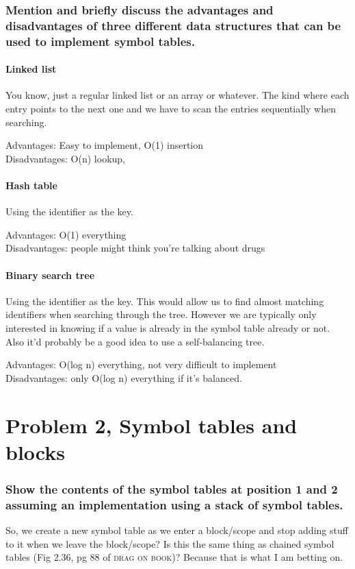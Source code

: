 \subsubsection{Mention and briefly discuss the advantages and disadvantages of three different data structures that can be used to implement symbol tables.}
\paragraph{Linked list}

You know, just a regular linked list or an array or whatever.
The kind where each entry points to the next one and we have to scan the entries sequentially when searching.

Advantages: Easy to implement, O(1) insertion\\
Disadvantages: O(n) lookup, 


\paragraph{Hash table}

Using the identifier as the key.

Advantages: O(1) everything\\
Disadvantages: people might think you're talking about drugs

\paragraph{Binary search tree}

Using the identifier as the key.
This would allow us to find almost matching identifiers when searching through the tree.
However we are typically only interested in knowing if a value is already in the symbol table already or not.
Also it'd probably be a good idea to use a self-balancing tree.

Advantages: O(log n) everything, not very difficult to implement\\
Disadvantages: only O(log n) everything if it's balanced.

\newpage
\setcounter{subsubsection}{0}
\section{Problem 2, Symbol tables and blocks}

\subsubsection{Show the contents of the symbol tables at position 1 and 2 assuming an implementation using a stack of symbol tables.}
So, we create a new symbol table as we enter a block/scope and stop adding stuff to it when we leave the block/scope?
Is this the same thing as chained symbol tables (Fig 2.36, pg 88 of \textsc{drag on book})?
Because that is what I am betting on.

